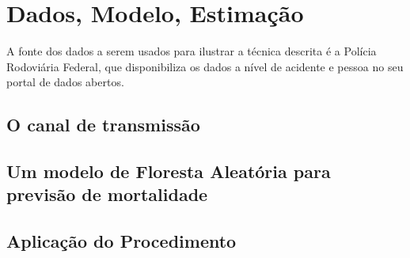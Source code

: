 

\chapter{Dados, Modelo, Estimação}

A fonte dos dados a serem usados para ilustrar a técnica descrita é a Polícia Rodoviária Federal, que disponibiliza os dados a nível de acidente e pessoa no seu portal de dados abertos. 

\section{O canal de transmissão}

\section{Um modelo de Floresta Aleatória para previsão de mortalidade}

\section{Aplicação do Procedimento}
